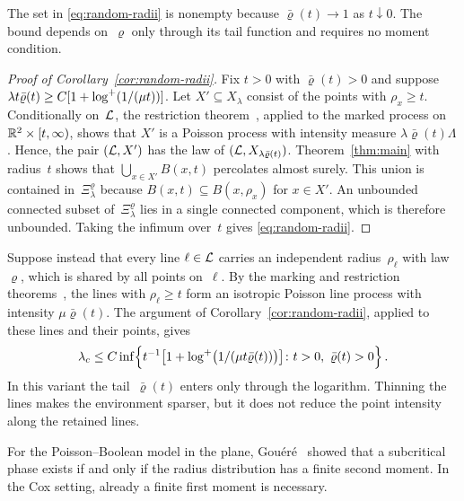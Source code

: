 \documentclass[11pt,letterpaper]{article}
\begin{document}
The set in \eqref{eq:random-radii} is nonempty because $\bar\varrho(t)\to1$ as $t\downarrow0$. The bound depends on~$\varrho$ only through its tail function and requires no moment condition.

\begin{proof}[Proof of Corollary~\ref{cor:random-radii}]
Fix $t>0$ with $\bar\varrho(t)>0$ and suppose $\lambda t\bar\varrho(t)\ge C[1+\log^{+}(1/(\mu t))]$. Let $X'\subseteq X_\lambda$ consist of the points with $\rho_x\ge t$. Conditionally on~$\mathcal L$, the restriction theorem~\cite[Theorem~5.2]{LP17}, applied to the marked process on $\mathbb R^2\times[t,\infty)$, shows that $X'$ is a Poisson process with intensity measure $\lambda\bar\varrho(t)\Lambda$. Hence, the pair $(\mathcal L,X')$ has the law of $(\mathcal L,X_{\lambda\bar\varrho(t)})$. Theorem~\ref{thm:main} with radius~$t$ shows that $\bigcup_{x\in X'}B(x,t)$ percolates almost surely. This union is contained in~$\Xi_\lambda^\varrho$ because $B(x,t)\subseteq B(x,\rho_x)$ for $x\in X'$. An unbounded connected subset of~$\Xi_\lambda^\varrho$ lies in a single connected component, which is therefore unbounded. Taking the infimum over~$t$ gives \eqref{eq:random-radii}.
\end{proof}

\begin{remark}
\label{rem:line-radii}
Suppose instead that every line $\ell\in\mathcal L$ carries an independent radius~$\rho_\ell$ with law~$\varrho$, which is shared by all points on~$\ell$. By the marking and restriction theorems~\cite[Theorems~5.2 and~5.6]{LP17}, the lines with $\rho_\ell\ge t$ form an isotropic Poisson line process with intensity $\mu\bar\varrho(t)$. The argument of Corollary~\ref{cor:random-radii}, applied to these lines and their points, gives
\begin{equation*}
  \lambda_c\le C\inf\Bigl\{t^{-1}\bigl[1+\logp\bigl(1/(\mu t\bar\varrho(t))\bigr)\bigr]\colon t>0,\ \bar\varrho(t)>0\Bigr\}\,.
\end{equation*}
In this variant the tail~$\bar\varrho(t)$ enters only through the logarithm. Thinning the lines makes the environment sparser, but it does not reduce the point intensity along the retained lines.
\end{remark}

For the Poisson--Boolean model in the plane, Gou\'er\'e~\cite{Gou08} showed that a subcritical phase exists if and only if the radius distribution has a finite second moment. In the Cox setting, already a finite first moment is necessary.
\end{document}
